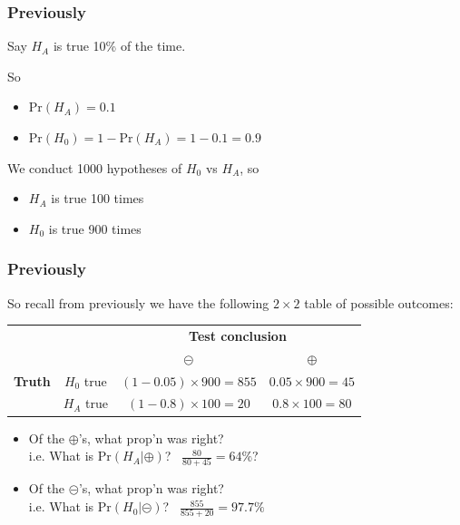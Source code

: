 \documentclass[handout]{beamer}
\newcommand{\prob}{\mbox{Pr}}
\newcommand{\cp}{\oplus}
\newcommand{\cm}{\circleddash}
\begin{document}
\begin{frame}
\frametitle{Previously}

%
%
Say $H_A$ is true 10\% of the time.

\vspace{0.25cm}

So 
\begin{itemize}
\item $\prob(H_A)=0.1$
\item $\prob(H_0) = 1- \prob(H_A) = 1-0.1=0.9$
\end{itemize}
\pause
\vspace{0.25cm}

We conduct 1000 hypotheses of $H_0$ vs $H_A$, so
\begin{itemize}
\item $H_A$ is true 100 times
\item $H_0$ is true 900 times
\end{itemize}



\end{frame}



\begin{frame}
\frametitle{Previously}

So recall from previously we have the following $2 \times 2$ table of possible outcomes:   

\begin{center}
  \begin{tabular}{cc|cc}
     \multicolumn{2}{c}{}  & \multicolumn{2}{c}{\textbf{Test conclusion}} \\ 
     &  & $\cm$ & $\cp$ \\ 
\hline
    \textbf{Truth} & $H_0$ true & $(1-0.05) \times 900 =  855$ & $0.05 \times 900 = 45$ \\
     & $H_A$ true & $(1-0.8)\times 100=20$ & $0.8\times 100= 80$\\ 
    \hline
  \end{tabular}
\end{center}

%
%
\begin{itemize}
\pause\item Of the $\cp$'s, what prop'n was right?\\
i.e. What is $\prob(H_A|\cp)$? \ $\frac{80}{80+45} = 64\%$?  
\pause\item Of the $\cm$'s, what prop'n was right?\\
i.e. What is $\prob(H_0|\cm)$? \ $\frac{855}{855+20} = 97.7\%$
\end{itemize}

\end{frame}
\end{document}
